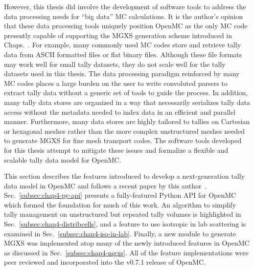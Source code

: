 However, this thesis did involve the development of software tools to address the data processing needs for ``big data'' \ac{MC} calculations. It is the author's opinion that these data processing tools uniquely position OpenMC as the only \ac{MC} code presently capable of supporting the \ac{MGXS} generation scheme introduced in Chaps.~. For example, many commonly used \ac{MC} codes store and retrieve tally data from \ac{ASCII} formatted files or flat binary files. Although these file formats may work well for small tally datasets, they do not scale well for the tally datasets used in this thesis. The data processing paradigm reinforced by many \ac{MC} codes places a large burden on the user to write convoluted parsers to extract tally data without a generic set of tools to guide the process. In addition, many tally data stores are organized in a way that necessarily serializes tally data access without the metadata needed to index data in an efficient and parallel manner. Furthermore, many data stores are highly tailored to tallies on Cartesian or hexagonal meshes rather than the more complex unstructured meshes needed to generate \ac{MGXS} for fine mesh transport codes. The software tools developed for this thesis attempt to mitigate these issues and formalize a flexible and scalable tally data model for OpenMC.



This section describes the features introduced to develop a next-generation tally data model in OpenMC and follows a recent paper by this author~\cite{boyd2016bigdata}. Sec.~\ref{subsec:chap4-py-api} presents a fully-featured Python \ac{API} for OpenMC which formed the foundation for much of this work. An algorithm to simplify tally management on unstructured but repeated tally volumes is highlighted in Sec.~\ref{subsec:chap4-distribcells}, and a feature to use isotropic in lab scattering is examined in Sec.~\ref{subsec:chap4-iso-in-lab}. Finally, a new module to generate \ac{MGXS} was implemented atop many of the newly introduced features in OpenMC as discussed in Sec.~\ref{subsec:chap4-mgxs}. All of the feature implementations were peer reviewed and incorporated into the v0.7.1 release of OpenMC.

